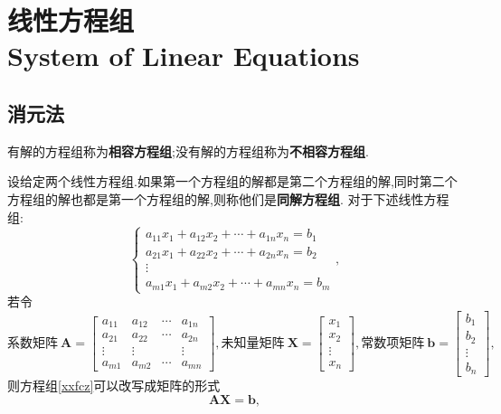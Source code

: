 \documentclass[9pt,a4paper]{book}
\begin{document}
\chapter{线性方程组\\System of Linear Equations}
\section{消元法}
\begin{defination}[相容方程组与不相容方程组的定义]
	有解的方程组称为\textbf{相容方程组};没有解的方程组称为\textbf{不相容方程组}.
\end{defination}
\begin{defination}
	设给定两个线性方程组.如果第一个方程组的解都是第二个方程组的解,同时第二个方程组的解也都是第一个方程组的解,则称他们是\textbf{同解方程组}.
	对于下述线性方程组:
	\begin{equation}\label{xxfcz}
		\left\{
		\begin{array}{c}
		a_{11}x_1+a_{12}x_2+\cdots+a_{1n}x_n=b_1\\
		a_{21}x_1+a_{22}x_2+\cdots+a_{2n}x_n=b_2\\
		\vdots \\
		a_{m1}x_1+a_{m2}x_2+\cdots+a_{mn}x_n=b_m
		\end{array}
		\right.,
	\end{equation}
	若令\[
	\text{系数矩阵}\ \bm{A}=\begin{bmatrix}
			a_{11} & a_{12} & \cdots & a_{1n}\\
			a_{21} & a_{22} & \cdots & a_{2n}\\
			\vdots & \vdots & \      & \vdots\\
			a_{m1} & a_{m2} & \cdots & a_{mn}
							\end{bmatrix},
	\text{未知量矩阵}\ \bm{X}=\begin{bmatrix}
								x_1\\
								x_2\\
								\vdots\\
								x_n
							\end{bmatrix},
	\text{常数项矩阵}\ \bm{b}=\begin{bmatrix}
	b_1\\
	b_2\\
	\vdots\\
	b_n
	\end{bmatrix},
	\]
	则方程组\ref{xxfcz}可以改写成矩阵的形式\[ \bm{AX}=\bm{b}, \]

\end{defination}
\end{document}
